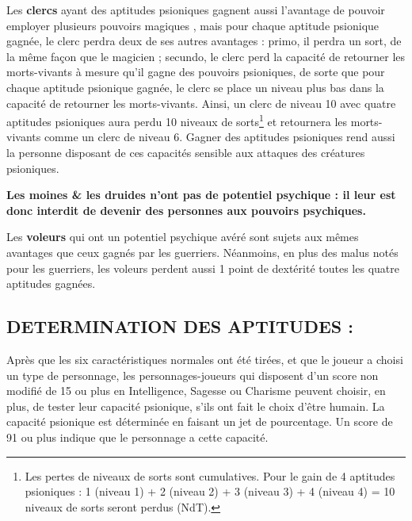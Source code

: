 \documentclass[11pt]{article}
\begin{document}
{\bigskip

Les \textbf{clercs} ayant des aptitudes psioniques gagnent aussi l'avantage de pouvoir employer plusieurs pouvoirs \og magiques \fg{}, mais pour chaque aptitude psionique gagnée, le clerc perdra deux de ses autres avantages : primo, il perdra un sort, de la même façon que le magicien ; secundo, le clerc perd la capacité de retourner les morts-vivants à mesure qu'il gagne des pouvoirs  psioniques, de sorte que pour chaque aptitude psionique gagnée, le clerc se place un niveau plus bas dans la capacité de retourner les morts-vivants. Ainsi, un clerc de niveau 10 avec quatre aptitudes psioniques aura perdu 10 niveaux de sorts\footnote{Les pertes de niveaux de sorts sont cumulatives. Pour le gain de 4 aptitudes psioniques : 1 (niveau 1) + 2 (niveau 2) + 3 (niveau 3) + 4 (niveau 4) = 10 niveaux de sorts seront perdus (NdT).} et retournera les morts-vivants comme un clerc de niveau 6. Gagner des aptitudes psioniques rend aussi la personne disposant de ces capacités sensible aux attaques des créatures psioniques.

\bigskip

\textbf{Les moines \& les druides n'ont pas de potentiel psychique : il leur est donc interdit de devenir des personnes aux pouvoirs psychiques.}

\bigskip

Les \textbf{voleurs} qui ont un potentiel psychique avéré sont sujets aux mêmes avantages que ceux gagnés par les guerriers. Néanmoins, en plus des malus notés pour les guerriers, les voleurs perdent aussi 1 point de dextérité toutes les quatre aptitudes gagnées.

\subsection*{\normalsize DETERMINATION DES APTITUDES :}

\medskip

Après que les six caractéristiques normales ont été tirées, et que le joueur a choisi un type de personnage, les personnages-joueurs qui disposent d'un score non modifié de 15 ou plus en Intelligence, Sagesse ou Charisme peuvent choisir, en plus, de tester leur capacité psionique, s'ils ont fait le choix d'être humain. La capacité psionique est déterminée en faisant un jet de pourcentage. Un score de 91 ou plus indique que le personnage a cette capacité.

}
\end{document}
